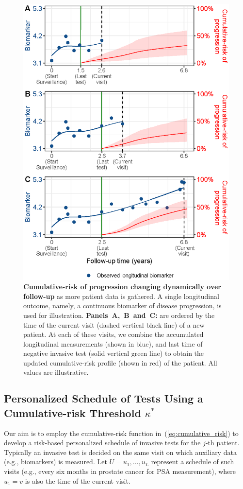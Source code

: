 \begin{figure}
\centerline{\includegraphics{images/dynrisk_plot_102.eps}}
\caption{\textbf{Cumulative-risk of progression changing dynamically over follow-up} as more patient data is gathered. A single longitudinal outcome, namely, a continuous biomarker of disease progression, is used for illustration. \textbf{Panels~A,~B~and~C:} are ordered by the time of the current visit (dashed vertical black line) of a new patient. At each of these visits, we combine the accumulated longitudinal measurements (shown in blue), and last time of negative invasive test (solid vertical green line) to obtain the updated cumulative-risk profile (shown in red) of the patient. All values are illustrative.} 
\label{fig:dynrisk_explanation}
\end{figure}

\subsection{Personalized Schedule of Tests Using a Cumulative-risk Threshold $\kappa^*$}
\label{subsec:pers_schedule}
Our aim is to employ the cumulative-risk function in~(\ref{eq:cumulative_risk}) to develop a risk-based personalized schedule of invasive tests for the $j$-th patient. Typically an invasive test is decided on the same visit on which auxiliary data (e.g., biomarkers) is measured. Let $U={u_1, \ldots, u_L}$ represent a schedule of such visits (e.g., every six months in prostate cancer for PSA measurement), where $u_1=v$ is also the time of the current visit.

